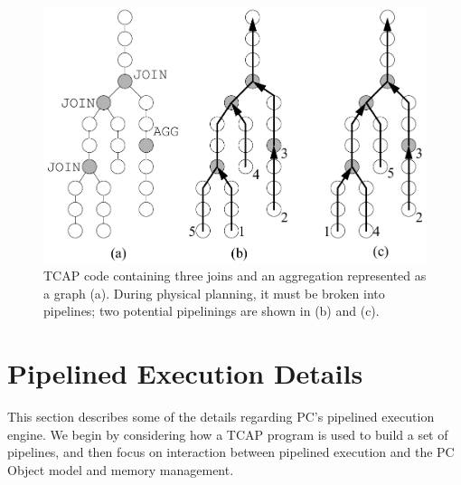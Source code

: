 
\begin{figure}[t]
  \begin{center}
    \includegraphics[width=6in]{DAG}
  \end{center}
\vspace{-10 pt}
  \caption{TCAP code containing three joins and an aggregation represented as a graph (a).  During physical planning, it must be broken into pipelines; two
potential pipelinings are shown in (b) and (c).}
  \label{fig:TCAP}
\end{figure}


\section{Pipelined Execution Details}
\label{sec:pipelined}

This section describes some of the details regarding PC's pipelined execution engine.  We begin by considering how a TCAP
program is used to build a set of pipelines, and then focus on interaction between pipelined execution and the PC Object model
and memory management.

